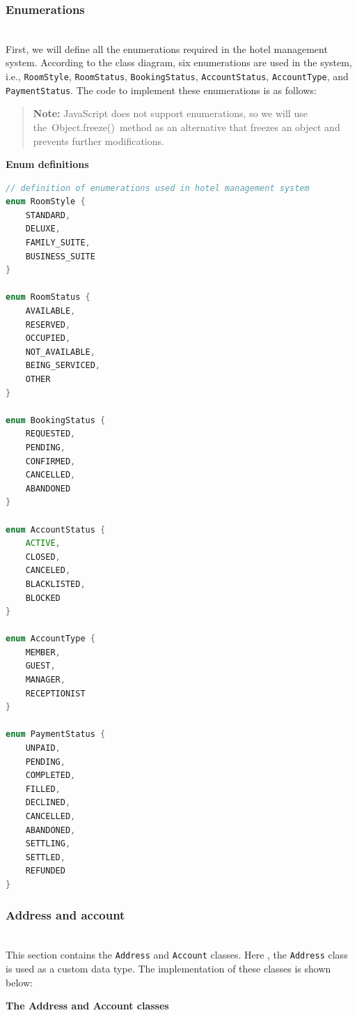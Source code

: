\subsubsection{Enumerations}\label{mMjnqIP0mInF9wBuqDk2B}
\\
First, we will define all the enumerations required in the hotel management system. According to the class diagram, six enumerations are used in the system, i.e., \texttt{RoomStyle}, \texttt{RoomStatus}, \texttt{BookingStatus}, \texttt{AccountStatus}, \texttt{AccountType}, and \texttt{PaymentStatus}. The code to implement these enumerations is as follows:
\begin{quote}
\textbf{Note:} JavaScript does not support enumerations, so we will use the\ Object.freeze()\ method as an alternative that freezes an object and prevents further modifications.
\end{quote}

\textbf{Enum definitions}

\begin{lstlisting}[language=Java]
// definition of enumerations used in hotel management system
enum RoomStyle {
    STANDARD, 
    DELUXE, 
    FAMILY_SUITE, 
    BUSINESS_SUITE
}

enum RoomStatus {
    AVAILABLE, 
    RESERVED, 
    OCCUPIED, 
    NOT_AVAILABLE, 
    BEING_SERVICED, 
    OTHER
}

enum BookingStatus {
    REQUESTED, 
    PENDING, 
    CONFIRMED,
    CANCELLED, 
    ABANDONED
}

enum AccountStatus {
    ACTIVE, 
    CLOSED, 
    CANCELED, 
    BLACKLISTED, 
    BLOCKED
}

enum AccountType {
    MEMBER, 
    GUEST, 
    MANAGER, 
    RECEPTIONIST
}

enum PaymentStatus {
    UNPAID, 
    PENDING, 
    COMPLETED, 
    FILLED, 
    DECLINED, 
    CANCELLED, 
    ABANDONED, 
    SETTLING, 
    SETTLED, 
    REFUNDED
}
\end{lstlisting}

\subsubsection{Address and account}\label{RWXA6Mmrdlki4DsobSWvj}
\\
This section contains the \texttt{Address} and \texttt{Account} classes. Here , the \texttt{Address} class is used as a custom data type. The implementation of these classes is shown below:

\textbf{The Address and Account classes}

